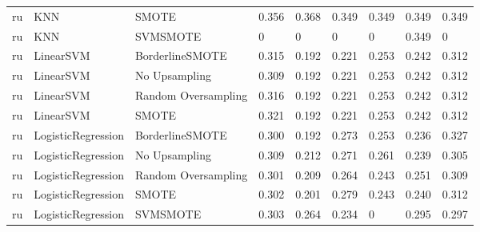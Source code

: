 \begin{tabular}{lllllllll}
      ru &                          KNN &               SMOTE & 0.356 &                     0.368 &                 0.349 &                  0.349 &                                   0.349 &     0.349 \\
      ru &                          KNN &            SVMSMOTE &     0 &                         0 &                     0 &                      0 &                                   0.349 &         0 \\
      ru &                    LinearSVM &     BorderlineSMOTE & 0.315 &                     0.192 &                 0.221 &                  0.253 &                                   0.242 &     0.312 \\
      ru &                    LinearSVM &       No Upsampling & 0.309 &                     0.192 &                 0.221 &                  0.253 &                                   0.242 &     0.312 \\
      ru &                    LinearSVM & Random Oversampling & 0.316 &                     0.192 &                 0.221 &                  0.253 &                                   0.242 &     0.312 \\
      ru &                    LinearSVM &               SMOTE & 0.321 &                     0.192 &                 0.221 &                  0.253 &                                   0.242 &     0.312 \\
      ru &           LogisticRegression &     BorderlineSMOTE & 0.300 &                     0.192 &                 0.273 &                  0.253 &                                   0.236 &     0.327 \\
      ru &           LogisticRegression &       No Upsampling & 0.309 &                     0.212 &                 0.271 &                  0.261 &                                   0.239 &     0.305 \\
      ru &           LogisticRegression & Random Oversampling & 0.301 &                     0.209 &                 0.264 &                  0.243 &                                   0.251 &     0.309 \\
      ru &           LogisticRegression &               SMOTE & 0.302 &                     0.201 &                 0.279 &                  0.243 &                                   0.240 &     0.312 \\
      ru &           LogisticRegression &            SVMSMOTE & 0.303 &                     0.264 &                 0.234 &                      0 &                                   0.295 &     0.297 \\

\end{tabular}
